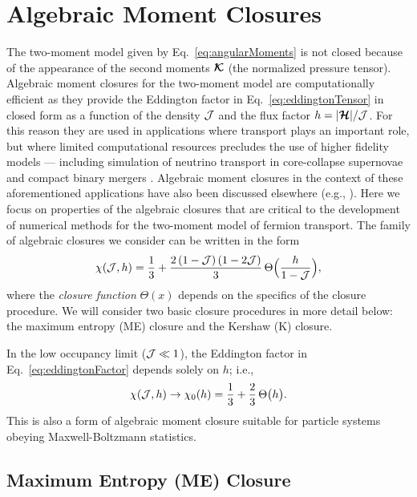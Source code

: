\section{Algebraic Moment Closures}
\label{sec:algebraicClosure}

The two-moment model given by Eq.~\eqref{eq:angularMoments} is not closed because of the appearance of the second moments $\boldsymbol{\mathcal{K}}$ (the normalized pressure tensor).  
Algebraic moment closures for the two-moment model are computationally efficient as they provide the Eddington factor in Eq.~\eqref{eq:eddingtonTensor} in closed form as a function of the density $\mathcal{J}$ and the flux factor $h=|\boldsymbol{\mathcal{H}}|/\mathcal{J}$.  
For this reason they are used in applications where transport plays an important role, but where limited computational resources precludes the use of higher fidelity models --- including simulation of neutrino transport in core-collapse supernovae \cite{roberts_etal_2016} and compact binary mergers \cite{foucart_etal_2015}.  
Algebraic moment closures in the context of these aforementioned applications have also been discussed elsewhere (e.g., \cite{janka_etal_1992,pons_etal_2000,smit_etal_2000,just_etal_2015,murchikova_etal_2017}).  
Here we focus on properties of the algebraic closures that are critical to the development of numerical methods for the two-moment model of fermion transport.  
The family of algebraic closures we consider can be written in the form \cite{cernohorskyBludman_1994}
\begin{equation}
  \chi(\mathcal{J},h)=\frac{1}{3}+\frac{2\,(1-\mathcal{J})\,(1-2\mathcal{J})}{3}\,\Theta\Big(\frac{h}{1-\mathcal{J}}\Big),
  \label{eq:eddingtonFactor}
\end{equation}
where the \emph{closure function} $\Theta(x)$ depends on the specifics of the closure procedure.  
We will consider two basic closure procedures in more detail below: the maximum entropy (ME) closure and the Kershaw (K) closure.  

In the low occupancy limit ($\mathcal{J}\ll1$), the Eddington factor in Eq.~\eqref{eq:eddingtonFactor} depends solely on $h$; i.e.,
\begin{equation}
  \chi(\mathcal{J},h)\to\chi_{0}(h)=\frac{1}{3}+\frac{2}{3}\,\Theta\big(h\big).  
  \label{eq:eddingtonFactorLow}
\end{equation}
This is also a form of algebraic moment closure suitable for particle systems obeying Maxwell-Boltzmann statistics.  

\subsection{Maximum Entropy (ME) Closure}

